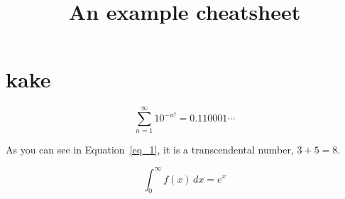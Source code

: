 \documentclass[defaultpackages]{cheatsheet}
\title{An example cheatsheet}
\begin{document}
\maketitle

\section{kake}

\lipsum[1-1]

\begin{equation}
	\sum_{n=1}^\infty 10^{-n!}=0.110001\cdots\label{eq_1}
\end{equation}

As you can see in Equation~\ref{eq_1}, it is a transcendental number, $3 + 5 = 8$.

\[ \int_0^\infty f(x)\, dx = e^x \]

\lipsum[1-1]

\lipsum[3-50]
\end{document}
